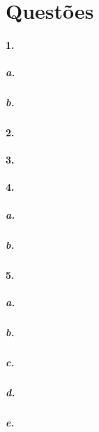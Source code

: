 \section*{Questões}
\paragraph{1.}


\subparagraph{a.}


\subparagraph{b.}


\paragraph{2.}


\paragraph{3.}


\paragraph{4.}
\subparagraph{a.}


\subparagraph{b.}


\paragraph{5.}


\subparagraph{a.}


\subparagraph{b.}


\subparagraph{c.}


\subparagraph{d.}


\subparagraph{e.}

